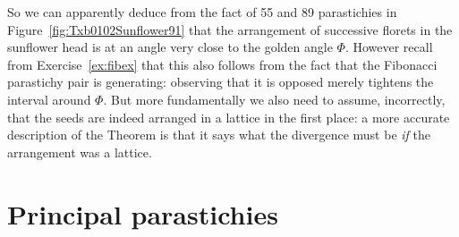 So we can apparently deduce from the fact of 55 and 89 parastichies in Figure~\ref{fig:Txb0102Sunflower91} that the arrangement of successive florets in the sunflower head is at an angle very close to the golden angle $\Phi$. However recall from Exercise~\ref{ex:fibex} that this also follows from the fact that the Fibonacci parastichy pair is generating: observing that it is opposed merely tightens the interval around $\Phi$. But more fundamentally we also need to assume, incorrectly, that the seeds are indeed arranged in a lattice in the first place: a more accurate description of the Theorem is that it says what the divergence must be \textit{if} the arrangement was a lattice. 

\section{Principal parastichies}

